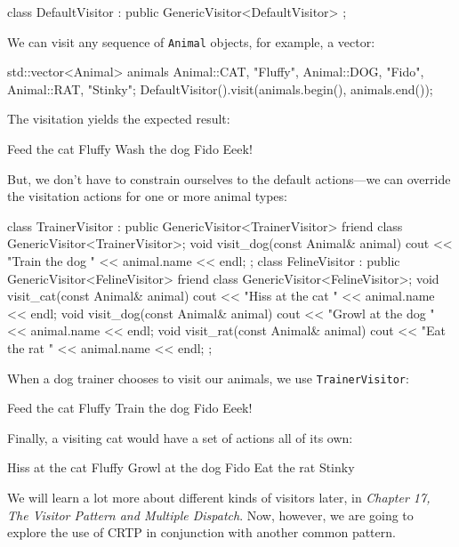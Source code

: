 \begin{code}
class DefaultVisitor :
  public GenericVisitor<DefaultVisitor> {
};
\end{code}

We can visit any sequence of \texttt{Animal} objects, for example, a vector:

\begin{code}
std::vector<Animal> animals {
  {Animal::CAT, "Fluffy"},
  {Animal::DOG, "Fido"},
  {Animal::RAT, "Stinky"}};
DefaultVisitor().visit(animals.begin(), animals.end());
\end{code}

The visitation yields the expected result:

\begin{code}
Feed the cat Fluffy
Wash the dog Fido
Eeek!
\end{code}

But, we don't have to constrain ourselves to the default actions---we can override the visitation actions for one or more animal types:

\begin{code}
class TrainerVisitor :
  public GenericVisitor<TrainerVisitor> {
  friend class GenericVisitor<TrainerVisitor>;
  void visit_dog(const Animal& animal) {
    cout << "Train the dog " << animal.name << endl;
  }
};
class FelineVisitor :
  public GenericVisitor<FelineVisitor> {
  friend class GenericVisitor<FelineVisitor>;
  void visit_cat(const Animal& animal) {
    cout << "Hiss at the cat " << animal.name << endl;
  }
  void visit_dog(const Animal& animal) {
    cout << "Growl at the dog " << animal.name << endl;
  }
  void visit_rat(const Animal& animal) {
    cout << "Eat the rat " << animal.name << endl;
  }
};
\end{code}

When a dog trainer chooses to visit our animals, we use \texttt{TrainerVisitor}:

\begin{code}
Feed the cat Fluffy
Train the dog Fido
Eeek!
\end{code}

Finally, a visiting cat would have a set of actions all of its own:

\begin{code}
Hiss at the cat Fluffy
Growl at the dog Fido
Eat the rat Stinky
\end{code}

We will learn a lot more about different kinds of visitors later, in \emph{Chapter 17, The Visitor Pattern and Multiple Dispatch}. Now, however, we are going to explore the use of CRTP in conjunction with another common pattern.

